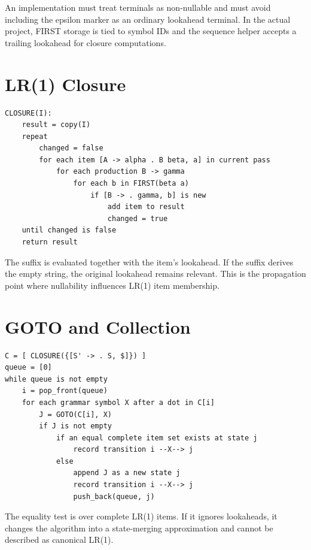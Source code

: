 \documentclass[12pt,a4paper,oneside]{report}
\begin{document}
An implementation must treat terminals as non-nullable and must avoid including the epsilon marker as an ordinary lookahead terminal. In the actual project, FIRST storage is tied to symbol IDs and the sequence helper accepts a trailing lookahead for closure computations.

\section{LR(1) Closure}
\begin{lstlisting}[caption={Closure with Contextual Lookahead},label={lst:closure}]
CLOSURE(I):
    result = copy(I)
    repeat
        changed = false
        for each item [A -> alpha . B beta, a] in current pass
            for each production B -> gamma
                for each b in FIRST(beta a)
                    if [B -> . gamma, b] is new
                        add item to result
                        changed = true
    until changed is false
    return result
\end{lstlisting}

The suffix is evaluated together with the item's lookahead. If the suffix derives the empty string, the original lookahead remains relevant. This is the propagation point where nullability influences LR(1) item membership.

\section{GOTO and Collection}
\begin{lstlisting}[caption={Canonical Collection Worklist},label={lst:collection}]
C = [ CLOSURE({[S' -> . S, $]}) ]
queue = [0]
while queue is not empty
    i = pop_front(queue)
    for each grammar symbol X after a dot in C[i]
        J = GOTO(C[i], X)
        if J is not empty
            if an equal complete item set exists at state j
                record transition i --X--> j
            else
                append J as a new state j
                record transition i --X--> j
                push_back(queue, j)
\end{lstlisting}

The equality test is over complete LR(1) items. If it ignores lookaheads, it changes the algorithm into a state-merging approximation and cannot be described as canonical LR(1).
\end{document}
